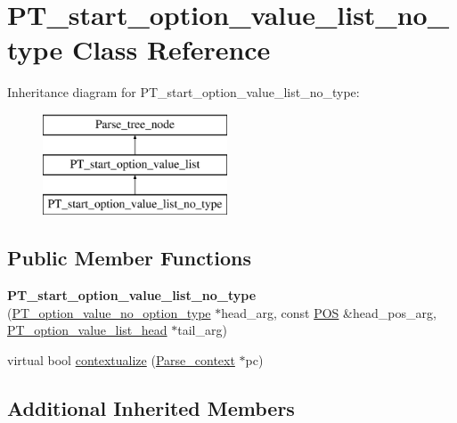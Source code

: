 \hypertarget{classPT__start__option__value__list__no__type}{}\section{P\+T\+\_\+start\+\_\+option\+\_\+value\+\_\+list\+\_\+no\+\_\+type Class Reference}
\label{classPT__start__option__value__list__no__type}
Inheritance diagram for P\+T\+\_\+start\+\_\+option\+\_\+value\+\_\+list\+\_\+no\+\_\+type\+:\begin{figure}[H]
\begin{center}
\leavevmode
\includegraphics[height=3.000000cm]{classPT__start__option__value__list__no__type}
\end{center}
\end{figure}
\subsection*{Public Member Functions}
\begin{DoxyCompactItemize}
\item 
\mbox{\label{classPT__start__option__value__list__no__type_a69f4b021c4baec246b10954a3235fb9d}} 
{\bfseries P\+T\+\_\+start\+\_\+option\+\_\+value\+\_\+list\+\_\+no\+\_\+type} (\mbox{\hyperlink{classPT__option__value__no__option__type}{P\+T\+\_\+option\+\_\+value\+\_\+no\+\_\+option\+\_\+type}} $\ast$head\+\_\+arg, const \mbox{\hyperlink{structYYLTYPE}{P\+OS}} \&head\+\_\+pos\+\_\+arg, \mbox{\hyperlink{classPT__option__value__list__head}{P\+T\+\_\+option\+\_\+value\+\_\+list\+\_\+head}} $\ast$tail\+\_\+arg)
\item 
virtual bool \mbox{\hyperlink{classPT__start__option__value__list__no__type_ab92ce1db2e283950ed9dedc12cd89ca9}{contextualize}} (\mbox{\hyperlink{structParse__context}{Parse\+\_\+context}} $\ast$pc)
\end{DoxyCompactItemize}
\subsection*{Additional Inherited Members}


